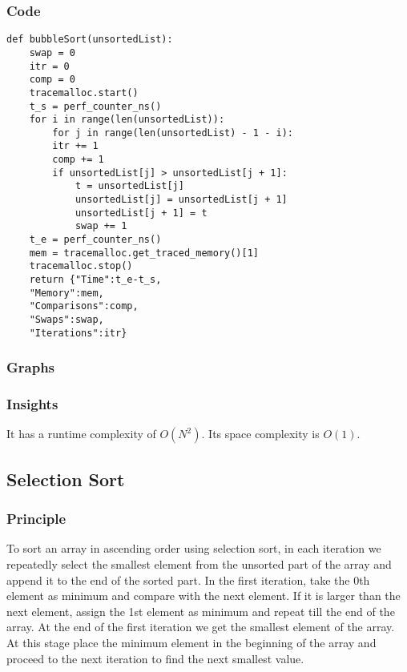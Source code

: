 \documentclass[12pt]{article}
\begin{document}
\subsubsection*{Code}
\begin{verbatim}
def bubbleSort(unsortedList):
	swap = 0
	itr = 0
	comp = 0
	tracemalloc.start()
	t_s = perf_counter_ns()
	for i in range(len(unsortedList)):
		for j in range(len(unsortedList) - 1 - i):
		itr += 1
		comp += 1
		if unsortedList[j] > unsortedList[j + 1]:
			t = unsortedList[j]
			unsortedList[j] = unsortedList[j + 1]
			unsortedList[j + 1] = t
			swap += 1
	t_e = perf_counter_ns()
	mem = tracemalloc.get_traced_memory()[1]
	tracemalloc.stop()
	return {"Time":t_e-t_s,
	"Memory":mem,
	"Comparisons":comp,
	"Swaps":swap,
	"Iterations":itr}
\end{verbatim}
\subsubsection*{Graphs}





\subsubsection*{Insights}
It has a runtime complexity of $O(N^2)$. Its space complexity is
$O(1)$.
\subsection{Selection Sort}
\subsubsection{Principle}
To sort an array in ascending order using selection sort, in each
iteration we repeatedly select the smallest element from the
unsorted part of the array and append it to the end of the sorted
part. In the first iteration, take the 0th element as minimum and
compare with the next element. If it is larger than the next
element, assign the 1st element as minimum and repeat till the
end of the array. At the end of the first iteration we get the
smallest element of the array. At this stage place the minimum
element in the beginning of the array and proceed to the next
iteration to find the next smallest value.
\end{document}
